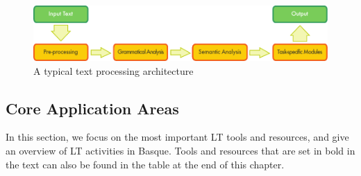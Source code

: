 \begin{multicols}{2}
\begin{figure}[b]
  \center
  \includegraphics[width=\textwidth]{../_media/english/text_processing_app_architecture}
  \caption{A typical text processing architecture}
  \label{fig:textprocessingarch_en}
\end{figure}
   


\subsection{Core Application Areas}

    In this section, we focus on the most important LT tools and resources, and give an overview of LT activities in Basque. Tools and resources that are set in bold in the text can also be found in the table at the end of this chapter.


\end{multicols}
